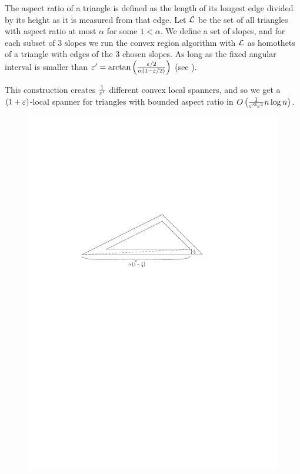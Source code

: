 \documentclass[12pt]{article}%
\begin{document}
The aspect ratio of a triangle is defined as the length of its longest
edge divided by its height as it is measured from that edge. Let $\mathcal{L}$
be the set of all triangles with aspect ratio at most $\alpha$ for
some $1 < \alpha$. We define a set of slopes, and for each subset of 3
slopes we run the convex region algorithm with $\mathcal{L}$ as homothets of a
triangle with edges of the 3 chosen slopes. As long as the fixed
angular interval is smaller than
$\varepsilon' = \arctan\left(\frac{\varepsilon/2}{\alpha(1-\varepsilon/2)}\right)$ (see
).

This construction creates $\frac{1}{\varepsilon'}$ different convex local
spanners, and so we get a $(1+\varepsilon)$-local spanner for triangles with
bounded aspect ratio in
$O\left(\frac{1}{\varepsilon'^3\varepsilon^3} n\log n\right)$.


\begin{figure}
    \centering
    \includegraphics[width=0.6\linewidth]{figs/triangle_shadow}
\end{figure}


 
%

\end{document}
